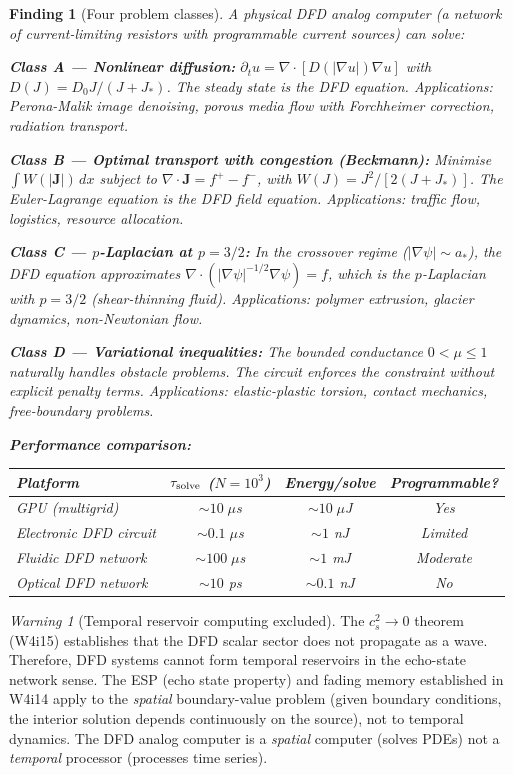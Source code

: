 \documentclass[11pt]{article}
\newtheorem{finding}[theorem]{Finding}
\theoremstyle{definition}
\theoremstyle{remark}
\newtheorem{warning}[theorem]{Warning}
\begin{document}
\begin{finding}[Four problem classes]
\label{find:problem-classes}
A physical DFD analog computer (a network of current-limiting resistors
with programmable current sources) can solve:

\textbf{Class A --- Nonlinear diffusion:}
$\partial_t u = \nabla \cdot [D(|\nabla u|)\nabla u]$ with
$D(J) = D_0 J/(J+J_*)$. The steady state is the DFD equation.
Applications: Perona-Malik image denoising, porous media flow with
Forchheimer correction, radiation transport.

\textbf{Class B --- Optimal transport with congestion (Beckmann):}
Minimise $\int W(|\mathbf{J}|)\,dx$ subject to $\nabla\cdot\mathbf{J}
= f^+ - f^-$, with $W(J) = J^2/[2(J+J_*)]$. The Euler-Lagrange
equation is the DFD field equation. Applications: traffic flow,
logistics, resource allocation.

\textbf{Class C --- $p$-Laplacian at $p = 3/2$:}
In the crossover regime ($|\nabla\psi| \sim a_*$), the DFD equation
approximates $\nabla\cdot(|\nabla\psi|^{-1/2}\nabla\psi) = f$, which
is the $p$-Laplacian with $p = 3/2$ (shear-thinning fluid).
Applications: polymer extrusion, glacier dynamics, non-Newtonian flow.

\textbf{Class D --- Variational inequalities:}
The bounded conductance $0 < \mu \leq 1$ naturally handles obstacle
problems. The circuit enforces the constraint without explicit penalty
terms. Applications: elastic-plastic torsion, contact mechanics,
free-boundary problems.

\textbf{Performance comparison:}
\begin{center}
\begin{tabular}{@{}lccc@{}}
\toprule
\textbf{Platform} & \textbf{$\tau_{\rm solve}$ ($N=10^3$)} &
\textbf{Energy/solve} & \textbf{Programmable?} \\
\midrule
GPU (multigrid) & $\sim 10\;\mu$s & $\sim 10\;\mu$J & Yes \\
Electronic DFD circuit & $\sim 0.1\;\mu$s & $\sim 1$ nJ & Limited \\
Fluidic DFD network & $\sim 100\;\mu$s & $\sim 1$ mJ & Moderate \\
Optical DFD network & $\sim 10$ ps & $\sim 0.1$ nJ & No \\
\bottomrule
\end{tabular}
\end{center}
\end{finding}

\begin{warning}[Temporal reservoir computing excluded]
The $c_s^2 \to 0$ theorem (W4i15) establishes that the DFD scalar sector
does not propagate as a wave. Therefore, DFD systems cannot form temporal
reservoirs in the echo-state network sense. The ESP (echo state property)
and fading memory established in W4i14 apply to the \emph{spatial}
boundary-value problem (given boundary conditions, the interior solution
depends continuously on the source), not to temporal dynamics. The DFD
analog computer is a \emph{spatial} computer (solves PDEs) not a
\emph{temporal} processor (processes time series).
\end{warning}
\end{document}
